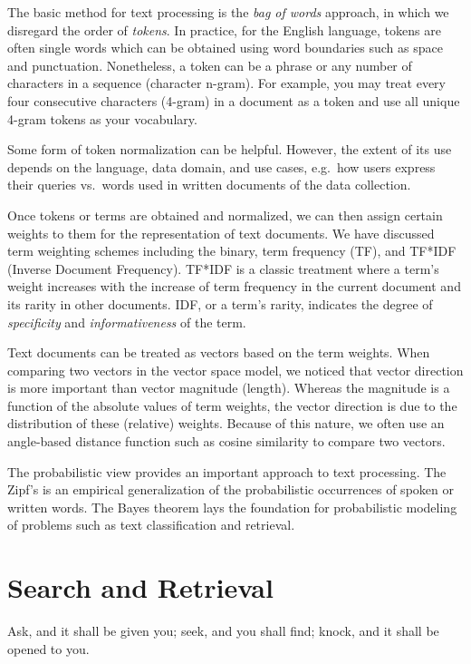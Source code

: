 \documentclass[
  letterpaper,
]{scrbook}
\begin{document}

The basic method for text processing is the \emph{bag of words}
approach, in which we disregard the order of \emph{tokens}. In practice,
for the English language, tokens are often single words which can be
obtained using word boundaries such as space and punctuation.
Nonetheless, a token can be a phrase or any number of characters in a
sequence (character n-gram). For example, you may treat every four
consecutive characters (4-gram) in a document as a token and use all
unique 4-gram tokens as your vocabulary.

Some form of token normalization can be helpful. However, the extent of
its use depends on the language, data domain, and use cases, e.g.~how
users express their queries vs.~words used in written documents of the
data collection.

Once tokens or terms are obtained and normalized, we can then assign
certain weights to them for the representation of text documents. We
have discussed term weighting schemes including the binary, term
frequency (TF), and TF*IDF (Inverse Document Frequency). TF*IDF is a
classic treatment where a term's weight increases with the increase of
term frequency in the current document and its rarity in other
documents. IDF, or a term's rarity, indicates the degree of
\emph{specificity} and \emph{informativeness} of the term.

Text documents can be treated as vectors based on the term weights. When
comparing two vectors in the vector space model, we noticed that vector
direction is more important than vector magnitude (length). Whereas the
magnitude is a function of the absolute values of term weights, the
vector direction is due to the distribution of these (relative) weights.
Because of this nature, we often use an angle-based distance function
such as cosine similarity to compare two vectors.

The probabilistic view provides an important approach to text
processing. The Zipf's is an empirical generalization of the
probabilistic occurrences of spoken or written words. The Bayes theorem
lays the foundation for probabilistic modeling of problems such as text
classification and retrieval.

\chapter{Search and Retrieval}\label{ch-search}

Ask, and it shall be given you; seek, and you shall find; knock, and it
shall be opened to you.
\end{document}
